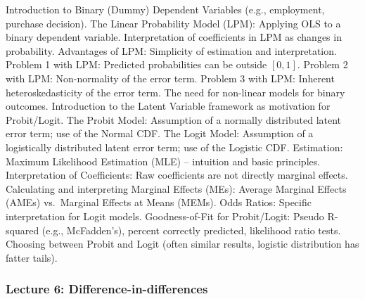 \documentclass[
]{article}
\begin{document}
Introduction to Binary (Dummy) Dependent Variables (e.g., employment,
purchase decision). The Linear Probability Model (LPM): Applying OLS to
a binary dependent variable. Interpretation of coefficients in LPM as
changes in probability. Advantages of LPM: Simplicity of estimation and
interpretation. Problem 1 with LPM: Predicted probabilities can be
outside \([0,1]\). Problem 2 with LPM: Non-normality of the error term.
Problem 3 with LPM: Inherent heteroskedasticity of the error term. The
need for non-linear models for binary outcomes. Introduction to the
Latent Variable framework as motivation for Probit/Logit. The Probit
Model: Assumption of a normally distributed latent error term; use of
the Normal CDF. The Logit Model: Assumption of a logistically
distributed latent error term; use of the Logistic CDF. Estimation:
Maximum Likelihood Estimation (MLE) -- intuition and basic principles.
Interpretation of Coefficients: Raw coefficients are not directly
marginal effects. Calculating and interpreting Marginal Effects (MEs):
Average Marginal Effects (AMEs) vs.~Marginal Effects at Means (MEMs).
Odds Ratios: Specific interpretation for Logit models. Goodness-of-Fit
for Probit/Logit: Pseudo R-squared (e.g., McFadden's), percent correctly
predicted, likelihood ratio tests. Choosing between Probit and Logit
(often similar results, logistic distribution has fatter tails).

\subsubsection{Lecture 6:
Difference-in-differences}\label{lecture-6-difference-in-differences}
\end{document}
